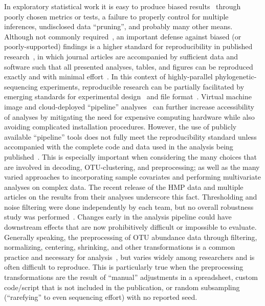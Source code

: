 \documentclass[10pt]{article}\usepackage{graphicx, color}
\begin{document}
In exploratory statistical work
it is easy to produce biased results~\cite{Ioannidis:2005bw}
through poorly chosen metrics or tests, 
a failure to properly control for multiple inferences,
undisclosed data ``pruning'', 
and probably many other means.
Although not commonly required~\cite{Merali:nature:2010,Peng02122011,Ince:2012iy},
an important defense against biased (or poorly-supported) findings
is a higher standard for reproducibility in published research~\cite{Carey:2010gq},
in which journal articles are accompanied by sufficient data and software
such that all presented analyses, tables, and figures
can be reproduced exactly and with minimal effort~\cite{Peng02122011}.
In this context of highly-parallel phylogenetic-sequencing experiments,
reproducible research can be partially facilitated by
emerging standards
for experimental design~\cite{Knight:2012gf}
and file format~\cite{McDonald:2012tk}.
Virtual machine image and cloud-deployed
``pipeline'' analyses~\cite{caporaso2010qiime,Angiuoli:2011ib,Meyer:2008db}
can further increase accessibility of analyses by mitigating
the need for expensive computing hardware
while also avoiding complicated installation procedures.
However, the use of publicly available ``pipeline'' tools 
does not fully meet the reproducibility standard
unless accompanied with the complete code and data used
in the analysis being published~\cite{Peng02122011}.
This is especially important when considering the many choices
that are involved in decoding, OTU-clustering, and preprocessing;
as well as the many varied approaches to
incorporating sample covariates
and performing multivariate analyses on complex data.
The recent release of the HMP data and multiple articles on the results
from their analyses underscore this fact.
Thresholding and noise filtering
were done independently by each team, 
but no overall robustness study was performed~\cite{HMPC:2012bb}.
Changes early in the analysis pipeline could have downstream effects
that are now prohibitively difficult or impossible to evaluate.
Generally speaking, the preprocessing of OTU abundance data 
through filtering, normalizing, centering, shrinking, and other transformations
is a common practice and necessary for analysis~\cite{Allison:2006fk}, 
but varies widely among researchers 
and is often difficult to reproduce.
This is particularly true when the preprocessing transformations are the result of 
``manual'' adjustments in a spreadsheet, 
custom code/script that is not included in the publication,
or random subsampling (``rarefying'' to even sequencing effort)
with no reported seed.
\end{document}

